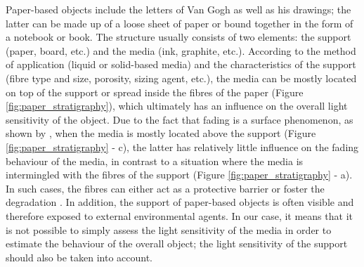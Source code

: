 Paper-based objects include the letters of Van Gogh as well as his drawings; the latter can be made up of a loose sheet of paper or bound together in the form of a notebook or book. The structure usually consists of two elements: the support (paper, board, etc.) and the media (ink, graphite, etc.). According to the method of application (liquid or solid-based media) and the characteristics of the support (fibre type and size, porosity, sizing agent, etc.), the media can be mostly located on top of the support or spread inside the fibres of the paper (Figure \ref{fig:paper_stratigraphy}), which ultimately has an influence on the overall light sensitivity of the object. Due to the fact that fading is a surface phenomenon, as shown by \citet{johnston-feller_kinetics_1984}, when the media is mostly located above the support (Figure \ref{fig:paper_stratigraphy} - c), the latter has relatively little influence on the fading behaviour of the media, in contrast to a situation where the media is intermingled with the fibres of the support (Figure \ref{fig:paper_stratigraphy} - a). In such cases, the fibres can either act as a protective barrier or foster the degradation \citep{launer_photochemical_1943, lee_damaging_1988, lee_influence_1986}. In addition, the support of paper-based objects is often visible and therefore exposed to external environmental agents. In our case, it means that it is not possible to simply assess the light sensitivity of the media in order to estimate the behaviour of the overall object; the light sensitivity of the support should also be taken into account.



